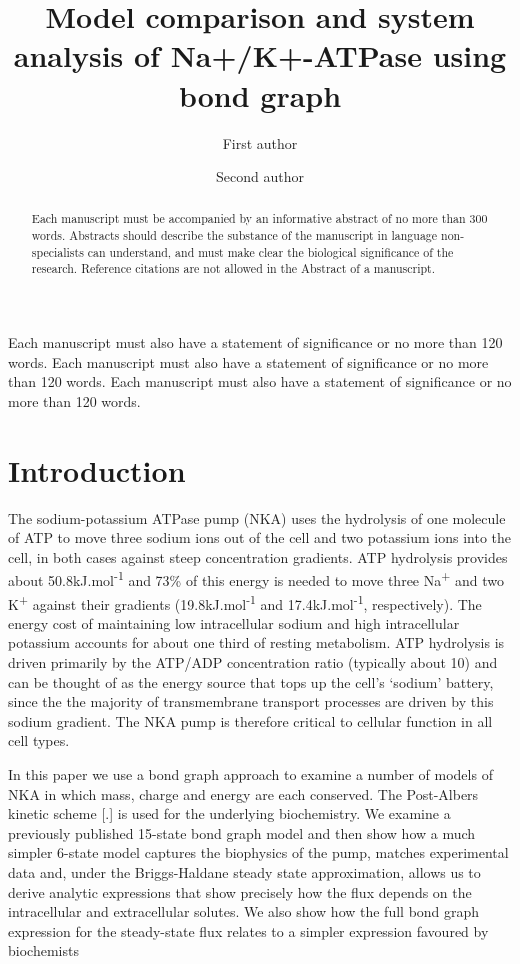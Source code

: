 \documentclass{biophys-new}
\title{Model comparison and system analysis of Na+/K+-ATPase using bond graph}
\author[1,*]{First author}
\author[2]{Second author}
\affil[1]{Institution A, Address A}
\affil[2]{Institution B, Address B}
\begin{document}
\begin{frontmatter}

\begin{abstract}
Each manuscript must be accompanied by an informative abstract of no more than 300 words. Abstracts should describe the substance of the manuscript in language non-specialists can understand, and must make clear the biological significance of the research. Reference citations are not allowed in the Abstract of a manuscript. 
\end{abstract}

\begin{sigstatement}
Each manuscript must also have a statement of significance or no more than 120 words. Each manuscript must also have a statement of significance or no more than 120 words. Each manuscript must also have a statement of significance or no more than 120 words.
\end{sigstatement}
\end{frontmatter}

\section*{Introduction}

The sodium-potassium ATPase pump (NKA) uses the hydrolysis of one
molecule of ATP to move three sodium ions out of the cell and two
potassium ions into the cell, in both cases against steep concentration
gradients. ATP hydrolysis provides about 50.8kJ.mol\textsuperscript{-1}
and 73\% of this energy is needed to move three Na\textsuperscript{+}
and two K\textsuperscript{+} against their gradients
(19.8kJ.mol\textsuperscript{-1} and 17.4kJ.mol\textsuperscript{-1},
respectively). The energy cost of maintaining low intracellular sodium
and high intracellular potassium accounts for about one third of resting
metabolism. ATP hydrolysis is driven primarily by the ATP/ADP
concentration ratio (typically about 10) and can be thought of as the
energy source that tops up the cell's `sodium' battery, since the the
majority of transmembrane transport processes are driven by this sodium
gradient. The NKA pump is therefore critical to cellular function in all
cell types.

In this paper we use a bond graph approach to examine a number of models
of NKA in which mass, charge and energy are each conserved. The
Post-Albers kinetic scheme {[}.{]} is used for the underlying
biochemistry. We examine a previously published 15-state bond graph
model and then show how a much simpler 6-state model captures the
biophysics of the pump, matches experimental data and, under the
Briggs-Haldane steady state approximation, allows us to derive analytic
expressions that show precisely how the flux depends on the
intracellular and extracellular solutes. We also show how the full bond
graph expression for the steady-state flux relates to a simpler
expression favoured by biochemists
\end{document}
